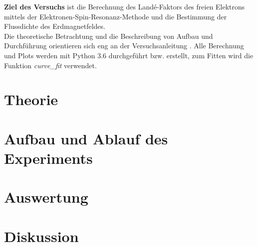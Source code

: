 \documentclass[a4,11pt]{article}
\newcommand{\V}{V28}
\begin{document}



\tableofcontents
\clearpage

\textbf{Ziel des Versuchs} ist die Berechnung des Landé-Faktors des freien Elektrons mittels der Elektronen-Spin-Resonanz-Methode und die Bestimmung der Flussdichte des Erdmagnetfeldes. \\
Die theoretische Betrachtung und die Beschreibung von Aufbau und Durchführung orientieren sich eng an der Versuchsanleitung \cite{V28}. Alle Berechnung und Plots werden mit Python 3.6 durchgeführt bzw. erstellt, zum Fitten wird die Funktion \textit{curve\_fit} verwendet.


\section{Theorie}

\clearpage


\section{Aufbau und Ablauf des Experiments}

\clearpage


\section{Auswertung}

\clearpage


\section{Diskussion}


\clearpage
\listoftodos
\listoffigures
\listoftables
\clearpage
\nocite{\V}
\printbibliography[title = Literaturverzeichnis]
\end{document}
